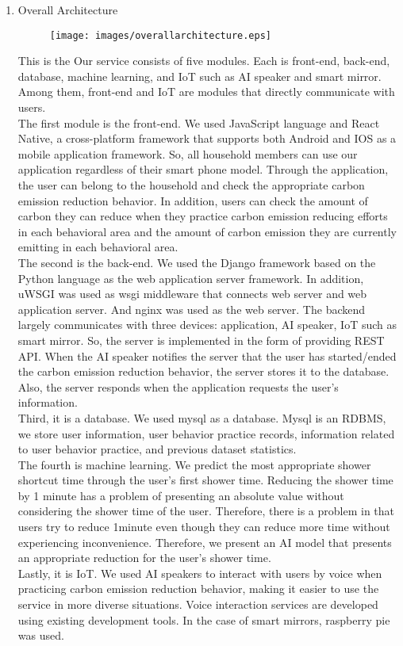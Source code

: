 \documentclass[11pt, conference]{IEEEtran}
\begin{document}
\begin{enumerate}[label=\arabic*]
    \item {\large{Overall Architecture}}\\
    \begin{figure}[H]
        \centering
        \texttt{[image: images/overallarchitecture.eps]}
    \end{figure}
    This is the Our service consists of five modules. Each is front-end, back-end, database, machine learning, and IoT such as AI speaker and smart mirror. Among them, front-end and IoT are modules that directly communicate with users. \\
    The first module is the front-end. We used JavaScript language and React Native, a cross-platform framework that supports both Android and IOS as a mobile application framework. So, all household members can use our application regardless of their smart phone model. Through the application, the user can belong to the household and check the appropriate carbon emission reduction behavior. In addition, users can check the amount of carbon they can reduce when they practice carbon emission reducing efforts in each behavioral area and the amount of carbon emission they are currently emitting in each behavioral area.\\
    The second is the back-end. We used the Django framework based on the Python language as the web application server framework. In addition, uWSGI was used as wsgi middleware that connects web server and web application server. And nginx was used as the web server. The backend largely communicates with three devices: application, AI speaker, IoT such as smart mirror. So, the server is implemented in the form of providing REST API. When the AI speaker notifies the server that the user has started/ended the carbon emission reduction behavior, the server stores it to the database. Also, the server responds when the application requests the user’s information.\\
    Third, it is a database.  We used mysql as a database. Mysql is an RDBMS, we store user information, user behavior practice records, information related to user behavior practice, and previous dataset statistics.\\
    The fourth is machine learning. We predict the most appropriate shower shortcut time through the user’s first shower time. Reducing the shower time by 1 minute has a problem of presenting an absolute value without considering the shower time of the user. Therefore, there is a problem in that users try to reduce 1minute even though they can reduce more time without experiencing inconvenience. Therefore, we present an AI model that presents an appropriate reduction for the user’s shower time.\\
    Lastly, it is IoT. We used AI speakers to interact with users by voice when practicing carbon emission reduction behavior, making it easier to use the service in more diverse situations. Voice interaction services are developed using existing development tools. In the case of smart mirrors, raspberry pie was used.\\
    

\end{enumerate}
\end{document}
